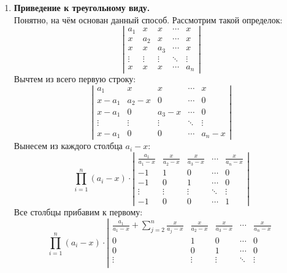 \documentclass{article}
\begin{document}
    \begin{enumerate}
        \item \textbf{Приведение к треугольному виду.}\\
        Понятно, на чём основан данный способ. Рассмотрим такой определок:
        $$
        \left|\begin{matrix}
            a_1 & x & x & \cdots & x\\
            x & a_2 & x & \cdots & x\\
            x & x & a_3 & \cdots & x\\
            \vdots & \vdots & \vdots & \ddots & \vdots\\
            x & x & x & \cdots & a_n
        \end{matrix}\right|
        $$
        Вычтем из всего первую строку:
        $$
        \left|\begin{matrix}
            a_1 & x & x & \cdots & x\\
            x-a_1 & a_2-x & 0 & \cdots & 0\\
            x-a_1 & 0 & a_3-x & \cdots & 0\\
            \vdots & \vdots & \vdots & \ddots & \vdots\\
            x-a_1 & 0 & 0 & \cdots & a_n-x
        \end{matrix}\right|
        $$
        Вынесем из каждого столбца $a_i-x$:
        $$
        \prod_{i=1}^n(a_i-x)\cdot
        \left|\begin{matrix}
            \frac{a_1}{a_1-x} & \frac x{a_2-x} & \frac x{a_3-x} & \cdots & \frac x{a_n-x}\\
            -1 & 1 & 0 & \cdots & 0\\
            -1 & 0 & 1 & \cdots & 0\\
            \vdots & \vdots & \vdots & \ddots & \vdots\\
            -1 & 0 & 0 & \cdots & 1
        \end{matrix}\right|
        $$
        Все столбцы прибавим к первому:
        $$
        \prod_{i=1}^n(a_i-x)\cdot
        \left|\begin{matrix}
            \frac{a_1}{a_1-x}+\sum\limits_{j=2}^n\frac x{a_j-x} & \frac x{a_2-x} & \frac x{a_3-x} & \cdots & \frac x{a_n-x}\\
            0 & 1 & 0 & \cdots & 0\\
            0 & 0 & 1 & \cdots & 0\\
            \vdots & \vdots & \vdots & \ddots & \vdots\\

\end{matrix}$$
\end{enumerate}
\end{document}
